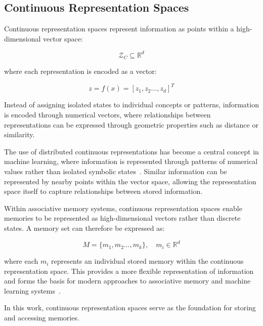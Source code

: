 
\subsection{Continuous Representation Spaces}

Continuous representation spaces represent information as points within a high-dimensional vector space:

\begin{equation}
    \mathcal{Z}_{C} \subseteq \mathbb{R}^{d}
\end{equation}

where each representation is encoded as a vector:

\begin{equation}
    z = f(x) = [z_1,z_2\ldots,z_d]^{T}
\end{equation}

Instead of assigning isolated states to individual concepts or patterns, information is encoded through numerical vectors, where relationships between representations can be expressed through geometric properties such as distance or similarity.

The use of distributed continuous representations has become a central concept in machine learning, where information is represented through patterns of numerical values rather than isolated symbolic states~\cite{hinton1986learning}. Similar information can be represented by nearby points within the vector space, allowing the representation space itself to capture relationships between stored information.

Within associative memory systems, continuous representation spaces enable memories to be represented as high-dimensional vectors rather than discrete states. A memory set can therefore be expressed as:

\begin{equation}
    M = \{m_1,m_2\ldots,m_k\}, \quad m_i \in \mathbb{R}^{d}
\end{equation}

where each $m_i$ represents an individual stored memory within the continuous representation space. This provides a more flexible representation of information and forms the basis for modern approaches to associative memory and machine learning systems~\cite{ramsauer2021hopfield}.

In this work, continuous representation spaces serve as the foundation for storing and accessing memories.